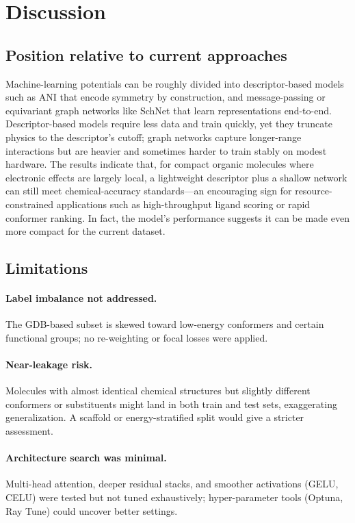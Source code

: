 \documentclass[11pt, twocolumn]{article}
\begin{document}
\section{Discussion}

\subsection{Position relative to current approaches}

Machine-learning potentials can be roughly divided into descriptor-based models such as ANI that encode symmetry by construction, and message-passing or equivariant graph networks like SchNet \cite{schutt2018schnet} that learn representations end-to-end. Descriptor-based models require less data and train quickly, yet they truncate physics to the descriptor's cutoff; graph networks capture longer-range interactions but are heavier and sometimes harder to train stably on modest hardware. The results indicate that, for compact organic molecules where electronic effects are largely local, a lightweight descriptor plus a shallow network can still meet chemical-accuracy standards—an encouraging sign for resource-constrained applications such as high-throughput ligand scoring or rapid conformer ranking. In fact, the model's performance suggests it can be made even more compact for the current dataset.

\subsection{Limitations}

\paragraph{Label imbalance not addressed.} The GDB-based subset is skewed toward low-energy conformers and certain functional groups; no re-weighting or focal losses were applied.

\paragraph{Near-leakage risk.} Molecules with almost identical chemical structures but slightly different conformers or substituents might land in both train and test sets, exaggerating generalization. A scaffold or energy-stratified split would give a stricter assessment.

\paragraph{Architecture search was minimal.} Multi-head attention, deeper residual stacks, and smoother activations (GELU, CELU) were tested but not tuned exhaustively; hyper-parameter tools (Optuna, Ray Tune) could uncover better settings.
\end{document}
